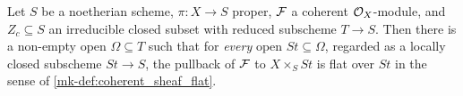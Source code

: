 \begin{lemma}

\label{mk-lem:flat_stratum_component}
  \leanok

  Let \(S\) be a noetherian scheme, \(\pi : X \to S\) proper, \(\mathcal{F}\) a
  coherent \(\mathcal{O}_X\)-module, and \(Z_c \subseteq S\) an irreducible closed
  subset with reduced subscheme \(T \to S\).  Then there is a non-empty open
  \(\Omega \subseteq T\) such that for \emph{every} open
  \(\mathit{St} \subseteq \Omega\), regarded as a locally closed subscheme
  \(\mathit{St} \to S\), the pullback of \(\mathcal{F}\) to
  \(X \times_S \mathit{St}\) is flat over \(\mathit{St}\) in the sense of
  \ref{mk-def:coherent_sheaf_flat}.
\end{lemma}

